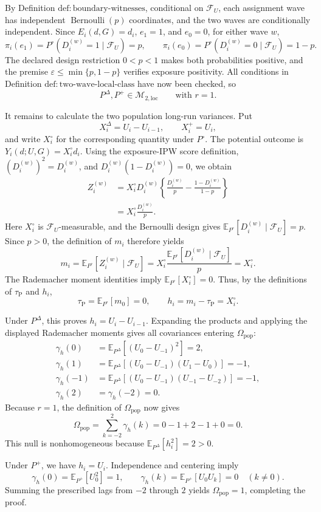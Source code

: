 By Definition \(\mathrm{def{:}boundary\text{-}witnesses}\), conditional on \(\mathcal F_U\), each assignment wave has independent \(\operatorname{Bernoulli}(p)\) coordinates, and the two waves are conditionally independent.  Since \(E_i(d,G)=d_i\), \(e_1=1\), and \(e_0=0\), for either wave \(w\),
\[
 \pi_i(e_1)=P^{\circ}(D_i^{(w)}=1\mid\mathcal F_U)=p,
 \qquad
 \pi_i(e_0)=P^{\circ}(D_i^{(w)}=0\mid\mathcal F_U)=1-p.
\]
The declared design restriction \(0<p<1\) makes both probabilities positive, and the premise \(\varepsilon\le\min\{p,1-p\}\) verifies exposure positivity.  All conditions in Definition \(\mathrm{def{:}two\text{-}wave\text{-}local\text{-}class}\) have now been checked, so
\[
 P^{\Delta},P^+\in\mathcal M_{2,\mathrm{loc}}
 \qquad\text{with }r=1.
\]

It remains to calculate the two population long-run variances.  Put
\[
 X_i^{\Delta}=U_i-U_{i-1},
 \qquad
 X_i^+=U_i,
\]
and write \(X_i^{\circ}\) for the corresponding quantity under \(P^{\circ}\).  The potential outcome is \(Y_i(d;U,G)=X_i^{\circ}d_i\).  Using the exposure-IPW score definition, \((D_i^{(w)})^2=D_i^{(w)}\), and \(D_i^{(w)}(1-D_i^{(w)})=0\), we obtain
\[
\begin{aligned}
 Z_i^{(w)}
 &=X_i^{\circ}D_i^{(w)}
 \left\{
   \frac{D_i^{(w)}}p-
   \frac{1-D_i^{(w)}}{1-p}
 \right\}\\
 &=X_i^{\circ}\frac{D_i^{(w)}}p.
\end{aligned}
\]
Here \(X_i^{\circ}\) is \(\mathcal F_U\)-measurable, and the Bernoulli design gives \(\mathbb E_{P^{\circ}}[D_i^{(w)}\mid\mathcal F_U]=p\).  Since \(p>0\), the definition of \(m_i\) therefore yields
\[
 m_i=\mathbb E_{P^{\circ}}[Z_i^{(w)}\mid\mathcal F_U]
 =X_i^{\circ}\frac{\mathbb E_{P^{\circ}}[D_i^{(w)}\mid\mathcal F_U]}p
 =X_i^{\circ}.
\]
The Rademacher moment identities imply \(\mathbb E_{P^{\circ}}[X_i^{\circ}]=0\).  Thus, by the definitions of \(\tau_{\mathrm P}\) and \(h_i\),
\[
 \tau_{\mathrm P}=\mathbb E_{P^{\circ}}[m_0]=0,
 \qquad
 h_i=m_i-\tau_{\mathrm P}=X_i^{\circ}.
\]

Under \(P^{\Delta}\), this proves \(h_i=U_i-U_{i-1}\).  Expanding the products and applying the displayed Rademacher moments gives all covariances entering \(\Omega_{\mathrm{pop}}\):
\[
\begin{aligned}
 \gamma_h(0)
 &=\mathbb E_{P^{\Delta}}[(U_0-U_{-1})^2]=2,\\
 \gamma_h(1)
 &=\mathbb E_{P^{\Delta}}[(U_0-U_{-1})(U_1-U_0)]=-1,\\
 \gamma_h(-1)
 &=\mathbb E_{P^{\Delta}}[(U_0-U_{-1})(U_{-1}-U_{-2})]=-1,\\
 \gamma_h(2)&=\gamma_h(-2)=0.
\end{aligned}
\]
Because \(r=1\), the definition of \(\Omega_{\mathrm{pop}}\) now gives
\[
 \Omega_{\mathrm{pop}}
 =\sum_{k=-2}^{2}\gamma_h(k)
 =0-1+2-1+0
 =0.
\]
This null is nonhomogeneous because \(\mathbb E_{P^{\Delta}}[h_i^2]=2>0\).

Under \(P^+\), we have \(h_i=U_i\).  Independence and centering imply
\[
 \gamma_h(0)=\mathbb E_{P^+}[U_0^2]=1,
 \qquad
 \gamma_h(k)=\mathbb E_{P^+}[U_0U_k]=0\quad(k\ne0).
\]
Summing the prescribed lags from \(-2\) through \(2\) yields \(\Omega_{\mathrm{pop}}=1\), completing the proof.
